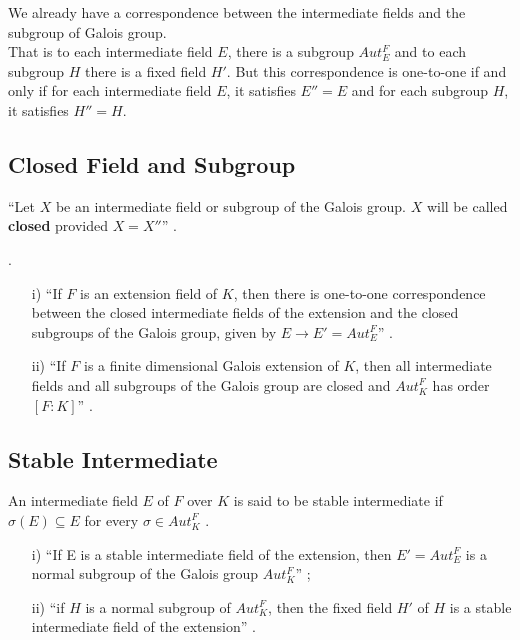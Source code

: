 \vspace{2mm}
We already have a correspondence between the intermediate fields and the subgroup of Galois group.\\
That is to each intermediate field \(E\), there is a subgroup \(Aut_E^F\) and to each subgroup \(H\) there is a fixed field \(H'\). But this correspondence is one-to-one if and only if for each intermediate field \(E\), it satisfies \(E''=E\) and for each subgroup \(H\), it satisfies \(H''=H\).

\subsection{Closed Field and Subgroup}
\begin{definition}
  ``Let \(X\) be an intermediate field or subgroup of the Galois group. \(X\) will be called \textbf{closed} provided \(X=X''\)'' \cite{hunger}.\\
\end{definition}
\clearpage

\begin{lemma}.
\begin{enumerate}
\item[i)] ``If \(F\) is an extension field of \(K\), then there is one-to-one correspondence between the closed intermediate fields of the extension and the closed subgroups of the Galois group, given by \(E \rightarrow E' =  Aut_E^F\)'' \cite{hunger}.
\item[ii)]``If \(F\) is a finite dimensional Galois extension of \(K\), then all intermediate fields and all subgroups of the Galois group are closed and \(Aut_K^F\) has order \([F:K]\)'' \cite{hunger}.
  \end{enumerate}
\end{lemma}
\vspace{3mm}

\subsection{Stable Intermediate}
\begin{definition}
  An intermediate field \(E\) of \(F\) over \(K\) is said to be stable intermediate if \(\sigma(E) \subseteq E\) for every \(\sigma \in Aut_K^F\) \cite{hunger}.
\end{definition}

\begin{lemma}
  \begin{enumerate}
  \item[i)] ``If E is a stable intermediate field of the extension, then \(E'=Aut_E^F\) is a normal subgroup of the Galois group \(Aut_K^F\)'' \cite{hunger};
  \item[ii)] ``if \(H\) is a normal subgroup of \(Aut_K^F\), then the fixed field \(H'\) of \(H\) is a stable intermediate field of the extension''
    \cite{hunger}.
  \end{enumerate}
\end{lemma}
\vspace{3mm}

